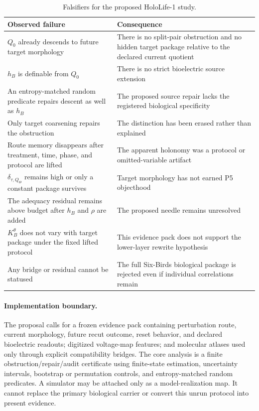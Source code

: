\begin{table}[htbp]
\centering
\small
\begin{tabularx}{\textwidth}{@{}lX@{}}
\toprule
Observed failure & Consequence \\
\midrule
$Q_0$ already descends to future target morphology &
There is no split-pair obstruction and no hidden target package relative to
the declared current quotient \\
$h_B$ is definable from $Q_0$ &
There is no strict bioelectric source extension \\
An entropy-matched random predicate repairs descent as well as $h_B$ &
The proposed source repair lacks the registered biological specificity \\
Only target coarsening repairs the obstruction &
The distinction has been erased rather than explained \\
Route memory disappears after treatment, time, phase, and protocol are
lifted &
The apparent holonomy was a protocol or omitted-variable artifact \\
$\delta_{\tau,Q_\Theta}$ remains high or only a constant package survives &
Target morphology has not earned P5 objecthood \\
The adequacy residual remains above budget after $h_B$ and $\rho$ are added &
The proposed needle remains unresolved \\
$K_B^\theta$ does not vary with target package under the fixed lifted
protocol &
This evidence pack does not support the lower-layer rewrite hypothesis \\
Any bridge or residual cannot be statused &
The full Six-Birds biological package is rejected even if individual
correlations remain \\
\bottomrule
\end{tabularx}
\caption{Falsifiers for the proposed HoloLife-1 study.}
\label{tab:hololife-falsifiers}
\end{table}

\paragraph{Implementation boundary.}
The proposal calls for a frozen evidence pack containing perturbation route,
current morphology, future recut outcome, reset behavior, and declared
bioelectric readouts; digitized voltage-map features; and molecular atlases
used only through explicit compatibility bridges.  The core analysis is a
finite obstruction/repair/audit certificate using finite-state estimation,
uncertainty intervals, bootstrap or permutation controls, and
entropy-matched random predicates.  A simulator may be attached only as a
model-realization map.  It cannot replace the primary biological carrier or
convert this unrun protocol into present evidence.

